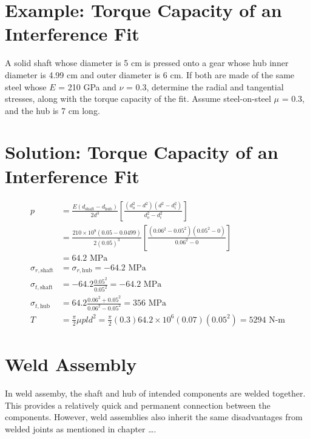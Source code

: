 \documentclass[a4paper,openany]{tufte-book}
\begin{document}
\section{Example: Torque Capacity of an Interference Fit}
\label{sec:org34a17bc}

A solid shaft whose diameter is 5 cm is pressed onto a gear whose hub inner diameter is 4.99 cm and outer diameter is 6 cm. If both are made of the same steel whose \(E\) = 210 GPa and \(\nu\) = 0.3, determine the radial and tangential stresses, along with the torque capacity of the fit. Assume steel-on-steel \(\mu\) = 0.3, and the hub is 7 cm long.

\section{Solution: Torque Capacity of an Interference Fit}
\label{sec:orga63ff74}

\begin{align*}
  p &= \frac{E(d_{\text{shaft}} - d_{\text{hub}})}{2d^{3}} \left[ \frac{(d_{o}^{2} - d^{2})(d^{2} - d_{i}^{2})}{d_{o}^{2} - d_{i}^{2}} \right] \\
    &= \frac{210 \times 10^{9} (0.05 - 0.0499)}{2(0.05)^{3}} \left[ \frac{(0.06^{2} - 0.05^{2})(0.05^{2} - 0)}{0.06^{2} - 0} \right] \\
    &= 64.2 \text{ MPa} \\
  \sigma_{r,\text{shaft}} &= \sigma_{r,\text{hub}} = -64.2 \text{ MPa} \\
  \sigma_{t,\text{shaft}} &= -64.2 \frac{0.05^{2}}{0.05^{2}} = -64.2 \text{ MPa} \\
  \sigma_{t,\text{hub}} &= 64.2 \frac{0.06^{2} + 0.05^{2}}{0.06^{2} - 0.05^{2}} = 356 \text{ MPa} \\
  T &= \frac{\pi}{2}\mu pld^{2} = \frac{\pi}{2}(0.3) 64.2 \times 10^{6} (0.07)(0.05^{2}) = 5294 \text{ N-m}
\end{align*}


\section{Weld Assembly}
\label{sec:org741fcfb}

In weld assemby, the shaft and hub of intended components are welded together. This provides a relatively quick and permanent connection between the components. However, weld assemblies also inherit the same disadvantages from welded joints as mentioned in chapter \ldots{}.
\end{document}
